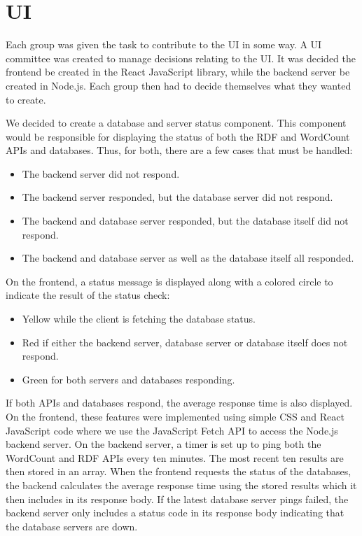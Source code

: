 \section{UI}\label{UI}
Each group was given the task to contribute to the \knox{} UI in some way. 
A UI committee was created to manage decisions relating to the UI. 
It was decided the frontend be created in the React JavaScript library\cite{Reactjs}, while the backend server be created in Node.js\cite{Nodejs}.
Each group then had to decide themselves what they wanted to create. 


We decided to create a database and server status component. 
This component would be responsible for displaying the status of both the RDF and WordCount APIs and databases. 
Thus, for both, there are a few cases that must be handled:
\begin{itemize}
	\item The backend server did not respond.
	\item The backend server responded, but the database server did not respond.
	\item The backend and database server responded, but the database itself did not respond.
	\item The backend and database server as well as the database itself all responded.
\end{itemize}

On the frontend, a status message is displayed along with a colored circle to indicate the result of the status check:
\begin{itemize}
	\item Yellow while the client is fetching the database status.
	\item Red if either the backend server, database server or database itself does not respond.
	\item Green for both servers and databases responding.
\end{itemize}
If both APIs and databases respond, the average response time is also displayed.
On the frontend, these features were implemented using simple CSS and React JavaScript code where we use the JavaScript Fetch API to access the Node.js backend server.
On the backend server, a timer is set up to ping both the WordCount and RDF APIs every ten minutes.
The most recent ten results are then stored in an array.
When the frontend requests the status of the databases, the backend calculates the average response time using the stored results which it then includes in its response body.
If the latest database server pings failed, the backend server only includes a status code in its response body indicating that the database servers are down.


